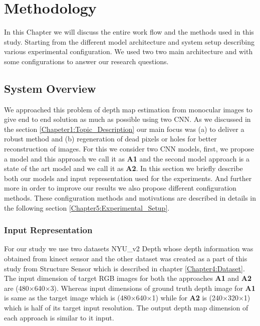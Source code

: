 
\chapter{Methodology}

\label{Chapter5:Methodology} 

In this Chapter we will discuss the entire work flow and the methods used in this study. Starting from the different model architecture and system setup describing various experimental configuration. We used two two main architecture and with some configurations to answer our research questions.


\section{System Overview}
We approached this problem of depth map estimation from monocular images to give end to end solution as much as possible using two CNN. As we discussed in the section \ref{Chapeter1:Topic_Description} our main focus was (a) to deliver a robust method and (b) regeneration of dead pixels or holes for better reconstruction of images. For this we consider two CNN models, first, we propose a model and this approach we call it as \textbf{A1} and the second model approach is a state of the art model and we call it as \textbf{A2}.  In this section we briefly describe both our models and input representation used for the experiments. And further more in order to improve our results we also propose different configuration methods. These configuration methods and motivations are described in details in the following section \ref{Chapter5:Experimental_Setup}. 


\subsection{Input Representation}
For our study we use two datasets NYU\_v2 Depth \cite{silberman11indoor} whose depth information was obtained from kinect sensor and the other dataset was created as a part of this study from Structure Sensor which is described in chapter \ref{Chapter4:Dataset}. The input dimension of target RGB images for both the approaches \textbf{A1} and \textbf{A2} are (480$\times$640$\times$3). Whereas input dimensions of ground truth depth image for \textbf{A1} is same as the target image  which is (480$\times$640$\times$1) while for \textbf{A2} is  (240$\times$320$\times$1) which is half of its target input resolution. The output depth map dimension of each approach is similar to it input.

